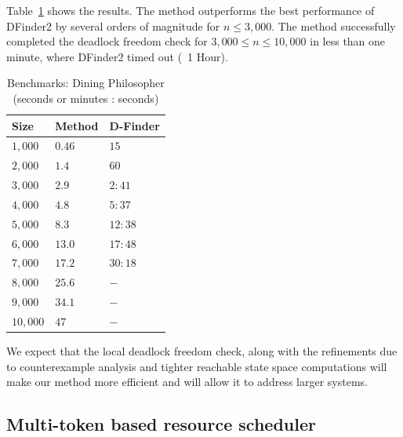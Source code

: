 Table~\ref{bench:dining} shows the results. 
The method outperforms the best performance of 
DFinder2 by several orders of magnitude 
for $n\leq 3,000$. 
The method successfully completed the deadlock freedom 
check for $3,000 \leq n \leq 10,000$ 
in less than one minute, where DFinder2 timed out (~1 Hour). 

\begin{table}
\caption{Benchmarks: Dining Philosopher (seconds or minutes : seconds)}
{\normalsize	
\begin{tabular}{| l | l | l |}
\hline
  Size & Method &   D-Finder \\ \hline \hline
$1,000$ &         $0.46 $      & $15$ \\ \hline
$2,000$ &          $1.4 $      & $60$ \\ \hline
$3,000$ &          $2.9 $     & $2:41$ \\ \hline
$4,000$ &          $4.8 $     & $5:37$ \\ \hline
$5,000$ &          $8.3 $     & $12:38$ \\ \hline
$6,000$ &          $13.0 $     & $17:48$ \\ \hline
$7,000$ &          $17.2 $     & $30:18$ \\ \hline
$8,000$ &          $25.6 $     & $-$ \\ \hline
$9,000$ &          $34.1 $    & $-$ \\ \hline
$10,000$ &          $47 $     & $-$ \\ \hline 
\end{tabular}
}
\label{bench:dining}
\end{table}

We expect that the local deadlock freedom check, along 
with the refinements due to counterexample analysis and 
tighter reachable state space computations will make our 
method more efficient and will allow it to address larger
systems. 


\subsection{Multi-token based resource scheduler}




